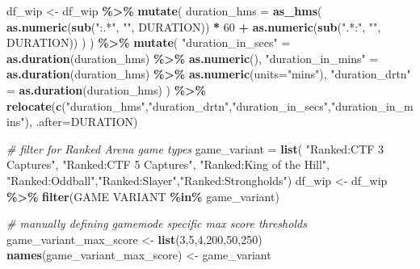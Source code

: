 \documentclass[
]{article}
\newenvironment{Shaded}{\begin{snugshade}}{\end{snugshade}}
\newcommand{\AttributeTok}[1]{\textcolor[rgb]{0.13,0.29,0.53}{#1}}
\newcommand{\CommentTok}[1]{\textcolor[rgb]{0.56,0.35,0.01}{\textit{#1}}}
\newcommand{\DecValTok}[1]{\textcolor[rgb]{0.00,0.00,0.81}{#1}}
\newcommand{\FunctionTok}[1]{\textcolor[rgb]{0.13,0.29,0.53}{\textbf{#1}}}
\newcommand{\NormalTok}[1]{#1}
\newcommand{\OtherTok}[1]{\textcolor[rgb]{0.56,0.35,0.01}{#1}}
\newcommand{\SpecialCharTok}[1]{\textcolor[rgb]{0.81,0.36,0.00}{\textbf{#1}}}
\newcommand{\StringTok}[1]{\textcolor[rgb]{0.31,0.60,0.02}{#1}}
\begin{document}
\begin{Shaded}
\begin{Highlighting}[]
\NormalTok{df\_wip }\OtherTok{\textless{}{-}}\NormalTok{ df\_wip }\SpecialCharTok{\%\textgreater{}\%}
  \FunctionTok{mutate}\NormalTok{(}
    \AttributeTok{duration\_hms =} \FunctionTok{as\_hms}\NormalTok{(}
      \FunctionTok{as.numeric}\NormalTok{(}\FunctionTok{sub}\NormalTok{(}\StringTok{":.*"}\NormalTok{, }\StringTok{""}\NormalTok{, DURATION)) }\SpecialCharTok{*} \DecValTok{60} \SpecialCharTok{+}
        \FunctionTok{as.numeric}\NormalTok{(}\FunctionTok{sub}\NormalTok{(}\StringTok{".*:"}\NormalTok{, }\StringTok{""}\NormalTok{, DURATION))}
\NormalTok{    )}
\NormalTok{  ) }\SpecialCharTok{\%\textgreater{}\%}
  \FunctionTok{mutate}\NormalTok{(}
    \StringTok{"duration\_in\_secs"} \OtherTok{=} \FunctionTok{as.duration}\NormalTok{(duration\_hms) }\SpecialCharTok{\%\textgreater{}\%} \FunctionTok{as.numeric}\NormalTok{(),}
    \StringTok{"duration\_in\_mins"} \OtherTok{=} \FunctionTok{as.duration}\NormalTok{(duration\_hms) }\SpecialCharTok{\%\textgreater{}\%} \FunctionTok{as.numeric}\NormalTok{(}\AttributeTok{units=}\StringTok{"mins"}\NormalTok{),}
    \StringTok{"duration\_drtn"} \OtherTok{=} \FunctionTok{as.duration}\NormalTok{(duration\_hms)}
\NormalTok{  ) }\SpecialCharTok{\%\textgreater{}\%}
  \FunctionTok{relocate}\NormalTok{(}\FunctionTok{c}\NormalTok{(}\StringTok{"duration\_hms"}\NormalTok{,}\StringTok{"duration\_drtn"}\NormalTok{,}\StringTok{"duration\_in\_secs"}\NormalTok{,}\StringTok{"duration\_in\_mins"}\NormalTok{),}
           \AttributeTok{.after=}\NormalTok{DURATION)}

\CommentTok{\# filter for Ranked Arena game types}
\NormalTok{game\_variant }\OtherTok{=} \FunctionTok{list}\NormalTok{(}
  \StringTok{"Ranked:CTF 3 Captures"}\NormalTok{, }\StringTok{"Ranked:CTF 5 Captures"}\NormalTok{, }\StringTok{"Ranked:King of the Hill"}\NormalTok{,}
  \StringTok{"Ranked:Oddball"}\NormalTok{,}\StringTok{"Ranked:Slayer"}\NormalTok{,}\StringTok{"Ranked:Strongholds"}\NormalTok{)}
\NormalTok{df\_wip }\OtherTok{\textless{}{-}}\NormalTok{ df\_wip }\SpecialCharTok{\%\textgreater{}\%} \FunctionTok{filter}\NormalTok{(}\StringTok{\textasciigrave{}}\AttributeTok{GAME VARIANT}\StringTok{\textasciigrave{}} \SpecialCharTok{\%in\%}\NormalTok{ game\_variant)}

\CommentTok{\# manually defining gamemode specific max score thresholds}
\NormalTok{game\_variant\_max\_score }\OtherTok{\textless{}{-}} \FunctionTok{list}\NormalTok{(}\DecValTok{3}\NormalTok{,}\DecValTok{5}\NormalTok{,}\DecValTok{4}\NormalTok{,}\DecValTok{200}\NormalTok{,}\DecValTok{50}\NormalTok{,}\DecValTok{250}\NormalTok{)}
\FunctionTok{names}\NormalTok{(game\_variant\_max\_score) }\OtherTok{\textless{}{-}}\NormalTok{ game\_variant}


\end{Highlighting}
\end{Shaded}
\end{document}

